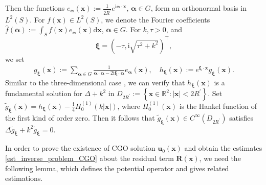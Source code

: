 \documentclass[11pt,reqno,oneside]{amsart}
\theoremstyle{definition}
\theoremstyle{remark}
\numberwithin{equation}{section}
\numberwithin{equation}{section}
\theoremstyle{remark}
\begin{document}
Then the functions $ e_{\bm{\alpha}} \left(\mathbf{x}\right) := \frac{1}{2 R^{\prime}}e^{\mathrm{i} \bm{\alpha} \cdot \mathbf{x}} $, $ \bm{\alpha} \in G $, form an orthonormal basis in $ L^2\left(S\right) $. For $ f\left(\mathbf{x}\right) \in L^2\left(S\right) $, we denote the Fourier coefficients $ \hat{f}\left(\bm{\alpha}\right) := \int_{S}f\left(\mathbf{x}\right) e_{\bm{\alpha}} \left(\mathbf{x}\right) \mathrm{d} \mathbf{x}$, $ \bm{\alpha} \in G $. For $ k, \tau > 0 $, and
\begin{equation}\label{eq:bmfxi}
\bm{\xi} = \left(-\tau, \mathrm{i}\sqrt{\tau^2+k^2} \right)^{\top},
\end{equation}
 we set
\begin{align} \label{eq_CGOs_g_xi_Psi_xi}
	g_{\bm{\xi}} \left(\mathbf{x}\right) := \sum_{\bm{\alpha} \in G} \frac{1}{\bm{\alpha} \cdot \bm{\alpha} - 2\mathrm{i} \bm{\xi} \cdot \bm{\alpha}} e_{\bm{\alpha}} \left(\mathbf{x}\right), \quad h_{\bm{\xi}} \left(\mathbf{x}\right) := e^{ \bm{\xi} \cdot \mathbf{x}} g_{\bm{\xi}}\left(\mathbf{x}\right).
\end{align}
Similar to the three-dimensional case \cite{hahner2002uniqueness}, we can verify that $ h_{\bm{\xi}}\left(\mathbf{x}\right) $ is a fundamental solution for $ \Delta+k^2 $ in $ D_{2R^{\prime}}:=\left\{\mathbf{x} \in \mathbb{R}^2:\left| \mathbf{x} \right|< 2R^{\prime}\right\} $. Set $ \tilde{g}_{\bm{\xi}} \left(\mathbf{x}\right) = h_{\bm{\xi}} \left(\mathbf{x}\right) - \frac{\mathrm{i}}{4} H_0^{\left(1\right)} \left(k\left|\mathbf{x}\right|\right) $, where $ H_0^{\left(1\right)}\left(\mathbf{x}\right) $ is the Hankel function of the first kind of order zero. Then it follows that $ \tilde{g}_{\bm{\xi}}\left(\mathbf{x}\right) \in C^{\infty} \left(D_{2R^{\prime}}\right) $ satisfies $ \Delta \tilde{g}_{\bm{\xi}} + k^2 \tilde{g}_{\bm{\xi}} = 0 $.

In order to prove the existence of CGO solution $ \mathbf{u}_0\left(\mathbf{x}\right) $ and obtain the estimates \eqref{est_inverse_problem_CGO} about the residual term $ \mathbf{R}\left(\mathbf{x}\right) $, we need the following lemma, which defines the potential operator and gives related estimations.
\end{document}
